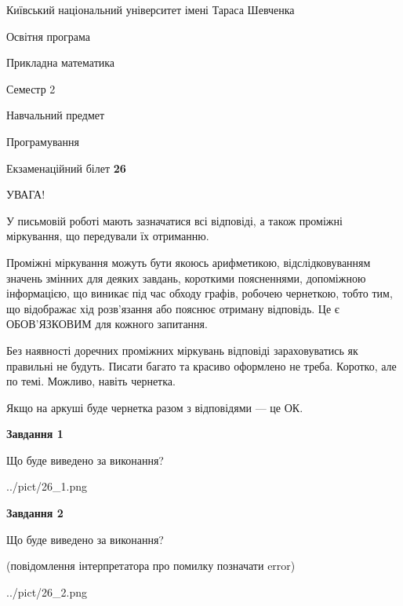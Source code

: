 \documentclass[12pt, ukrainian]{article}
\begin{document}
{{\begin {small}\par
{ \center  Київський національний університет імені Тараса Шевченка \par}
{\parbox {5 cm}{Освітня програма \hfill}{\parbox {7 cm}{Прикладна математика\hfill}}\parbox {6 cm}{\hfill Семестр 2}}\par
{\parbox {5 cm} {Навчальний предмет \hfill}\parbox {7 cm}{Програмування \hfill}\parbox {6cm}{\hfill}\par}\vspace{-7pt} \end{small}}{\center Екзаменаційний білет \No \textbf
{ 26 }\par}}
{
\begin {large}
УВАГА!

У письмовій роботі мають зазначатися всі відповіді, а також проміжні міркування, що передували їх отриманню.

Проміжні міркування можуть бути якоюсь арифметикою, відслідковуванням зна\-чень змінних для деяких завдань,
короткими поясненнями, допоміжною інформацією, що виникає під час обходу графів, робочею чернеткою,
тобто тим, що відображає хід розв’язання або пояснює отриману відповідь.
Це є ОБОВ’ЯЗКОВИМ для кожного запитання.

Без наявності доречних проміжних міркувань відповіді зараховуватись як правиль\-ні не будуть.
Писати багато та красиво оформлено не треба. Коротко, але по темі. Можли\-во, навіть чернетка.

Якщо на аркуші буде чернетка разом з відповідями --- це ОК.

\newpage

{\begin {center}\textbf{Завдання 1}\end {center}}\par
Що буде виведено за виконання?\par
\begin{center}
	{../pict/26_1.png}
\end{center}
\newpage

{\begin {center}\textbf{Завдання 2}\end {center}}\par
Що буде виведено за виконання?\par
 (повідомлення інтерпретатора про помилку позначати error)\par
\begin{center}
	{../pict/26_2.png}
\end{center}
\newpage


\end{large}}
\end{document}
